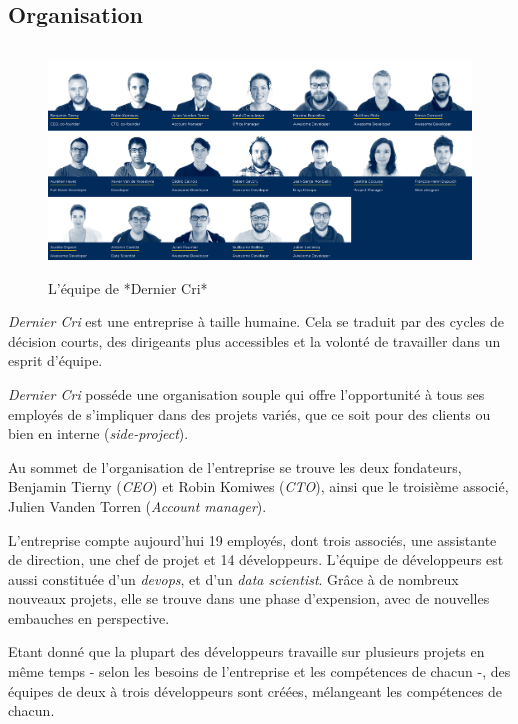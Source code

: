\documentclass[12pt,a4paper]{article}
\begin{document}
  \bigskip

  \subsection{Organisation}\label{organisation}

  \begin{figure}[h]
    \centering
    \includegraphics[height=6cm]{figures/team.png}
    \caption{L'équipe de *Dernier Cri*}
  \end{figure}

  \bigskip

  \emph{Dernier Cri} est une entreprise à taille humaine. Cela se traduit
  par des cycles de décision courts, des dirigeants plus accessibles et la
  volonté de travailler dans un esprit d'équipe.

  \bigskip

  \emph{Dernier Cri} posséde une organisation souple qui offre
  l'opportunité à tous ses employés de s'impliquer dans des projets
  variés, que ce soit pour des clients ou bien en interne
  (\emph{side-project}).

  \bigskip

  Au sommet de l'organisation de l'entreprise se trouve les deux
  fondateurs, Benjamin Tierny (\emph{CEO}) et Robin Komiwes (\emph{CTO}),
  ainsi que le troisième associé, Julien Vanden Torren (\emph{Account
  manager}).

  \bigskip

  L'entreprise compte aujourd'hui 19 employés, dont trois associés, une
  assistante de direction, une chef de projet et 14 développeurs. L'équipe
  de développeurs est aussi constituée d'un \emph{devops}, et d'un
  \emph{data scientist}. Grâce à de nombreux nouveaux projets, elle se
  trouve dans une phase d'expension, avec de nouvelles embauches en
  perspective.

  \bigskip

  Etant donné que la plupart des développeurs travaille sur plusieurs
  projets en même temps - selon les besoins de l'entreprise et les
  compétences de chacun -, des équipes de deux à trois développeurs sont
  créées, mélangeant les compétences de chacun.
\end{document}
